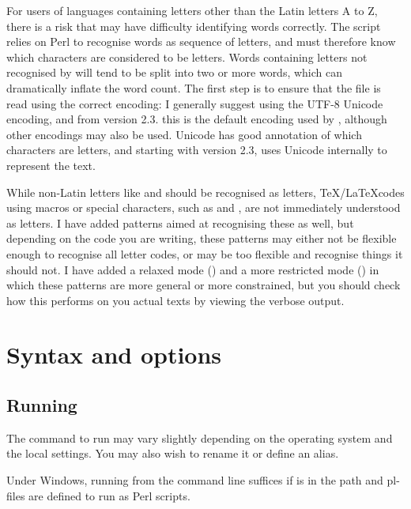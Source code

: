 \documentclass{article}
\begin{document}
For users of languages containing letters other than the Latin letters A to Z, there is a risk that \TeXcount{} may have difficulty identifying words correctly. The script relies on Perl to recognise words as sequence of letters, and must therefore know which characters are considered to be letters. Words containing letters not recognised by \TeXcount{} will tend to be split into two or more words, which can dramatically inflate the word count. The first step is to ensure that the file is read using the correct encoding: I generally suggest using the UTF-8 Unicode encoding, and from version 2.3. this is the default encoding used by \TeXcount{}, although other encodings may also be used. Unicode has good annotation of which characters are letters, and starting with version 2.3, \TeXcount{} uses Unicode internally to represent the text.

While non-Latin letters like \code{\aa} and  should be recognised as letters, \TeX/\LaTeX codes using macros or special characters, such as  and , are not immediately understood as letters. I have added patterns aimed at recognising these as well, but depending on the code you are writing, these patterns may either not be flexible enough to recognise all letter codes, or may be too flexible and recognise things it should not. I have added a relaxed mode () and a more restricted mode () in which these patterns are more general or more constrained, but you should check how this performs on you actual texts by viewing the verbose output.




\section{Syntax and options}


\subsection{Running \TeXcount{}}

The command to run \TeXcount{} may vary slightly depending on the operating system and the local settings. You may also wish to rename it or define an alias.

Under Windows, running  from the command line suffices if  is in the path and pl-files are defined to run as Perl scripts.
\end{document}

